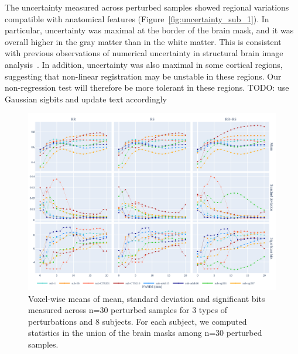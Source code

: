 \documentclass{article}
\newcommand{\TODO}[1]{\color{red}\textsc{TODO:} #1\color{black}\xspace}
\begin{document}
The uncertainty measured across perturbed samples showed regional variations
compatible with anatomical features (Figure~\ref{fig:uncertainty_sub_1}).
In
particular, uncertainty was maximal at the border of the brain mask, and it was
overall higher in the gray matter than in the white matter. This is consistent
with previous observations of numerical uncertainty in structural brain image
analysis~\cite{salari2021accurate}. In addition, uncertainty was also maximal in
some cortical regions, suggesting that non-linear registration may be unstable
in these regions. Our non-regression test will therefore be more tolerant in
these regions. \TODO{use Gaussian sigbits and update text accordingly}


\begin{figure}
    \centering
    \includegraphics[width=\linewidth]{figures/stats.pdf}
    \caption{Voxel-wise means of mean, standard deviation and significant bits
        measured across n=30 perturbed samples for 3 types of perturbations and 8
        subjects. For each subject, we computed statistics in the union of the brain
        masks among n=30 perturbed samples.}
    \label{fig:numerical-uncertainty}
\end{figure}
\end{document}
